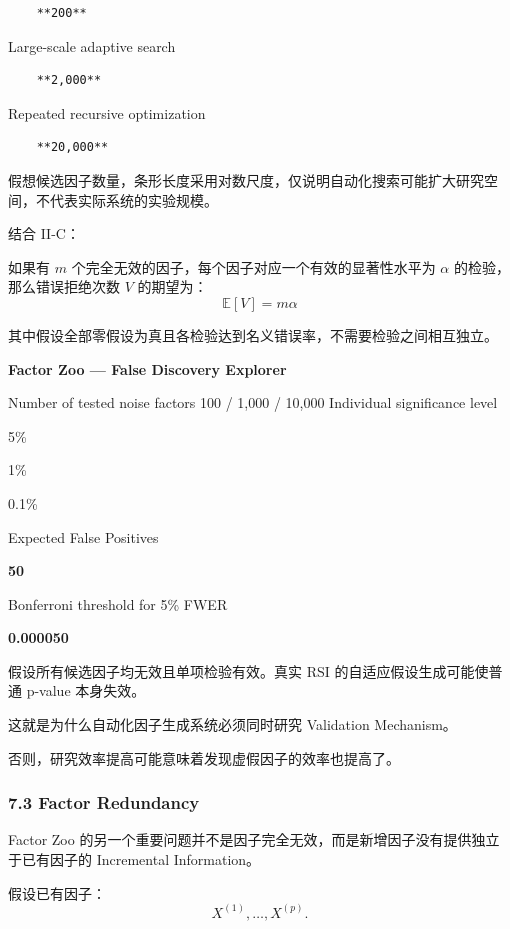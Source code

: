 \begin{verbatim}
    **200**
\end{verbatim}

Large-scale adaptive search

\begin{verbatim}
    **2,000**
\end{verbatim}

Repeated recursive optimization

\begin{verbatim}
    **20,000**
\end{verbatim}

假想候选因子数量，条形长度采用对数尺度，仅说明自动化搜索可能扩大研究空间，不代表实际系统的实验规模。

结合 II-C：

如果有 \(m\) 个完全无效的因子，每个因子对应一个有效的显著性水平为 \(\alpha\) 的检验，那么错误拒绝次数 \(V\) 的期望为：
\[\mathbb E[V]=m\alpha\]

其中假设全部零假设为真且各检验达到名义错误率，不需要检验之间相互独立。

\textbf{Factor Zoo --- False Discovery Explorer}

Number of tested noise factors 100 / 1,000 / 10,000 Individual significance level

5\%

1\%

0.1\%

Expected False Positives

\textbf{50}

Bonferroni threshold for 5\% FWER

\textbf{0.000050}

假设所有候选因子均无效且单项检验有效。真实 RSI 的自适应假设生成可能使普通 p-value 本身失效。

这就是为什么自动化因子生成系统必须同时研究 Validation Mechanism。

否则，研究效率提高可能意味着发现虚假因子的效率也提高了。

\hypertarget{part-4-63-0001-factor-redundancy}{%
\subsubsection{7.3 Factor Redundancy}\label{part-4-63-0001-factor-redundancy}}

Factor Zoo 的另一个重要问题并不是因子完全无效，而是新增因子没有提供独立于已有因子的 Incremental Information。

假设已有因子：
\[X^{(1)},\ldots,X^{(p)}.\]

